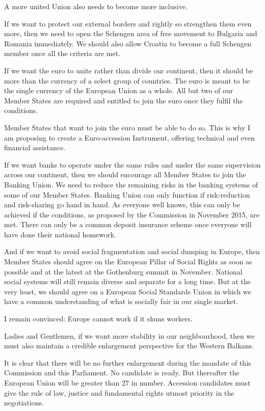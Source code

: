 \documentclass[a4paper,11pt]{article}
\begin{document}
A more united Union also needs to become more inclusive.

If we want to protect our external borders and rightly so strengthen them even more, then we need to open the Schengen area of free movement to Bulgaria and Romania immediately. We should also allow Croatia to become a full Schengen member once all the criteria are met.

If we want the euro to unite rather than divide our continent, then it should be more than the currency of a select group of countries. The euro is meant to be the single currency of the European Union as a whole. All but two of our Member States are required and entitled to join the euro once they fulfil the conditions.

Member States that want to join the euro must be able to do so. This is why I am proposing to create a Euro-accession Instrument, offering technical and even financial assistance.

If we want banks to operate under the same rules and under the same supervision across our continent, then we should encourage all Member States to join the Banking Union. We need to reduce the remaining risks in the banking systems of some of our Member States. Banking Union can only function if risk-reduction and risk-sharing go hand in hand. As everyone well knows, this can only be achieved if the conditions, as proposed by the Commission in November 2015, are met. There can only be a common deposit insurance scheme once everyone will have done their national homework.

And if we want to avoid social fragmentation and social dumping in Europe, then Member States should agree on the European Pillar of Social Rights as soon as possible and at the latest at the Gothenburg summit in November. National social systems will still remain diverse and separate for a long time. But at the very least, we should agree on a European Social Standards Union in which we have a common understanding of what is socially fair in our single market.

I remain convinced: Europe cannot work if it shuns workers.

Ladies and Gentlemen, if we want more stability in our neighbourhood, then we must also maintain a credible enlargement perspective for the Western Balkans.

It is clear that there will be no further enlargement during the mandate of this Commission and this Parliament. No candidate is ready. But thereafter the European Union will be greater than 27 in number. Accession candidates must give the rule of law, justice and fundamental rights utmost priority in the negotiations.
\end{document}
